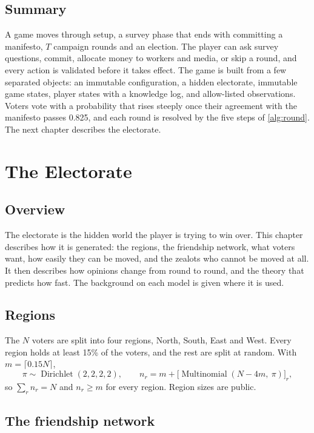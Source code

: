 \documentclass[11pt,a4paper,oneside]{report}
\newcommand{\overviewsection}{\section{Overview}}
\newcommand{\summarysection}{\section{Summary}}
\begin{document}
\summarysection

A game moves through setup, a survey phase that ends with committing a manifesto, $T$ campaign rounds and
an election. The player can ask survey questions, commit, allocate money to workers and media, or skip a
round, and every action is validated before it takes effect. The game is built from a few separated
objects: an immutable configuration, a hidden electorate, immutable game states, player states with a
knowledge log, and allow-listed observations. Voters vote with a probability that rises steeply once their
agreement with the manifesto passes 0.825, and each round is resolved by the five steps of
\cref{alg:round}. The next chapter describes the electorate.

\chapter{The Electorate}\label{ch:electorate}

\overviewsection

The electorate is the hidden world the player is trying to win over. This chapter describes how it is
generated: the regions, the friendship network, what voters want, how easily they can be moved, and the
zealots who cannot be moved at all. It then describes how opinions change from round to round, and the
theory that predicts how fast. The background on each model is given where it is used.

\section{Regions}

The $N$ voters are split into four regions, North, South, East and West. Every region holds at least 15\%
of the voters, and the rest are split at random. With $m=\lceil 0.15N\rceil$,
\begin{equation}
  \pi \sim \operatorname{Dirichlet}(2,2,2,2), \qquad
  n_r = m + \bigl[\operatorname{Multinomial}(N-4m,\ \pi)\bigr]_r ,
\end{equation}
so $\sum_r n_r = N$ and $n_r \ge m$ for every region. Region sizes are public.

\section{The friendship network}
\end{document}
